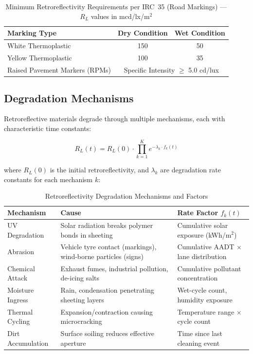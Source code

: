 \documentclass[11pt,a4paper]{article}
\begin{document}
\begin{table}[H]
\centering
\caption{Minimum Retroreflectivity Requirements per IRC~35 (Road Markings) --- $R_L$ values in mcd/lx/m$^2$}
\label{tab:irc35}
\begin{tabular}{@{}lcc@{}}
\toprule
\textbf{Marking Type} & \textbf{Dry Condition} & \textbf{Wet Condition} \\
\midrule
White Thermoplastic & 150 & 50 \\
Yellow Thermoplastic & 100 & 35 \\
Raised Pavement Markers (RPMs) & \multicolumn{2}{c}{Specific Intensity $\geq$ 5.0 cd/lux} \\
\bottomrule
\end{tabular}
\end{table}

\subsection{Degradation Mechanisms}

Retroreflective materials degrade through multiple mechanisms, each with characteristic time constants:

\begin{equation}
R_L(t) = R_L(0) \cdot \prod_{k=1}^{K} e^{-\lambda_k \cdot f_k(t)}
\label{eq:degradation_model}
\end{equation}

where $R_L(0)$ is the initial retroreflectivity, and $\lambda_k$ are degradation rate constants for each mechanism $k$:

\begin{table}[H]
\centering
\caption{Retroreflectivity Degradation Mechanisms and Factors}
\label{tab:degradation}
\begin{tabular}{@{}p{3cm}p{5cm}p{5cm}@{}}
\toprule
\textbf{Mechanism} & \textbf{Cause} & \textbf{Rate Factor $f_k(t)$} \\
\midrule
UV Degradation & Solar radiation breaks polymer bonds in sheeting & Cumulative solar exposure (kWh/m$^2$) \\
Abrasion & Vehicle tyre contact (markings), wind-borne particles (signs) & Cumulative AADT $\times$ lane distribution \\
Chemical Attack & Exhaust fumes, industrial pollution, de-icing salts & Cumulative pollutant concentration \\
Moisture Ingress & Rain, condensation penetrating sheeting layers & Wet-cycle count, humidity exposure \\
Thermal Cycling & Expansion/contraction causing microcracking & Temperature range $\times$ cycle count \\
Dirt Accumulation & Surface soiling reduces effective aperture & Time since last cleaning event \\
\bottomrule
\end{tabular}
\end{table}
\end{document}
